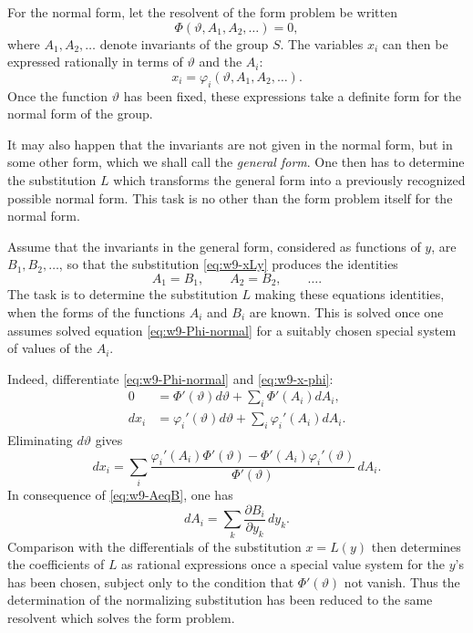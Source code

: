 \documentclass[11pt,a4paper]{book}
\begin{document}
For the normal form, let the resolvent of the form problem be written
\begin{equation}\label{eq:w9-Phi-normal}
 \Phi(\vartheta,A_1,A_2,\ldots)=0,
\end{equation}
where $A_1,A_2,\ldots$ denote invariants of the group $S$.  The variables $x_i$ can then be expressed rationally in terms of $\vartheta$ and the $A_i$:
\begin{equation}\label{eq:w9-x-phi}
 x_i=\varphi_i(\vartheta,A_1,A_2,\ldots).
\end{equation}
Once the function $\vartheta$ has been fixed, these expressions take a definite form for the normal form of the group.

It may also happen that the invariants are not given in the normal form, but in some other form, which we shall call the \emph{general form}.  One then has to determine the substitution $L$ which transforms the general form into a previously recognized possible normal form.  This task is no other than the form problem itself for the normal form.

Assume that the invariants in the general form, considered as functions of $y$, are $B_1,B_2,\ldots$, so that the substitution \eqref{eq:w9-xLy} produces the identities
\begin{equation}\label{eq:w9-AeqB}
 A_1=B_1,
 \qquad A_2=B_2,
 \qquad \ldots .
\end{equation}
The task is to determine the substitution $L$ making these equations identities, when the forms of the functions $A_i$ and $B_i$ are known.  This is solved once one assumes solved equation \eqref{eq:w9-Phi-normal} for a suitably chosen special system of values of the $A_i$.

Indeed, differentiate \eqref{eq:w9-Phi-normal} and \eqref{eq:w9-x-phi}:
\begin{align*}
0&=\Phi'(\vartheta)d\vartheta+\sum_i\Phi'(A_i)dA_i,\\
dx_i&=\varphi_i'(\vartheta)d\vartheta+
       \sum_i\varphi_i'(A_i)dA_i.
\end{align*}
Eliminating $d\vartheta$ gives
\begin{equation}\label{eq:w9-dx}
 dx_i=
 \sum_i
 \frac{\varphi_i'(A_i)\Phi'(\vartheta)-\Phi'(A_i)\varphi_i'(\vartheta)}
      {\Phi'(\vartheta)}\,dA_i.
\end{equation}
In consequence of \eqref{eq:w9-AeqB}, one has
\begin{equation}\label{eq:w9-dA}
 dA_i=\sum_k\frac{\partial B_i}{\partial y_k}\,dy_k.
\end{equation}
Comparison with the differentials of the substitution $x=L(y)$ then determines the coefficients of $L$ as rational expressions once a special value system for the $y$'s has been chosen, subject only to the condition that $\Phi'(\vartheta)$ not vanish.  Thus the determination of the normalizing substitution has been reduced to the same resolvent which solves the form problem.
\end{document}
